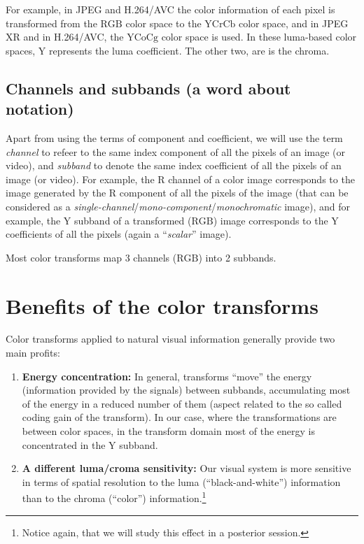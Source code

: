For example, in JPEG and H.264/AVC the color information of each pixel
is transformed from the $\text{RGB}$ color space to the $\text{YCrCb}$
color space, and in JPEG XR and in H.264/AVC, the $\text{YCoCg}$ color
space is used. In these luma-based color spaces, $\text{Y}$ represents
the luma coefficient. The other two, are is the chroma.

\subsection*{Channels and subbands (a word about notation)}

Apart from using the terms of component and coefficient, we will use
the term \emph{channel} to refeer to the same index component of all
the pixels of an image (or video), and \emph{subband} to denote the
same index coefficient of all the pixels of an image (or video). For
example, the $\text{R}$ channel of a color image corresponds to the
image generated by the $\text{R}$ component of all the pixels of the
image (that can be considered as a
\emph{single-channel}/\emph{mono-component}/\emph{monochromatic}
image), and for example, the $\text{Y}$ subband of a transformed
($\text{RGB}$) image corresponds to the $\text{Y}$ coefficients of
all the pixels (again a ``\emph{scalar}'' image).

Most color transforms map 3 channels ($\text{RGB}$) into 2 subbands.

\section{Benefits of the color transforms}

Color transforms applied to natural visual information generally
provide two main profits:
\begin{enumerate}
\item \textbf{Energy concentration:} In general, transforms ``move''
  the energy (information provided by the signals) between subbands,
  accumulating most of the energy in a reduced number of them (aspect
  related to the so called coding gain of the transform). In our case,
  where the transformations are between color spaces, in the transform
  domain most of the energy is concentrated in the $\text{Y}$
  subband.
\item \textbf{A different luma/croma sensitivity:} Our visual system
  is more sensitive in terms of spatial resolution to the luma
  (``black-and-white'') information than to the chroma
  (``color'') information.\footnote{Notice again, that we will study
  this effect in a posterior session.}
\end{enumerate}

